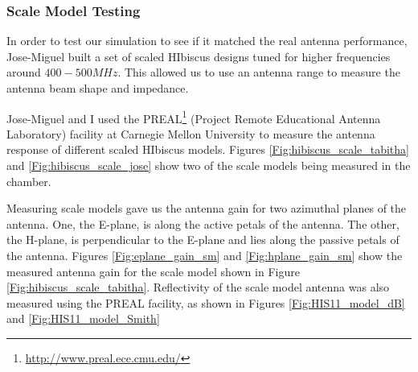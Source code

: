 \subsubsection{Scale Model Testing}

In order to test our simulation to see if it matched the real antenna performance, Jose-Miguel built a set of scaled HIbiscus designs tuned for higher frequencies around $400-500 MHz$. This allowed us to use an antenna range to measure the antenna beam shape and impedance. 

Jose-Miguel and I used the PREAL\footnote{\url{http://www.preal.ece.cmu.edu/}} (Project Remote Educational Antenna Laboratory) facility at Carnegie Mellon University to measure the antenna response of different scaled HIbiscus models. Figures \ref{Fig:hibiscus_scale_tabitha} and \ref{Fig:hibiscus_scale_jose} show two of the scale models being measured in the chamber.

Measuring scale models gave us the antenna gain for two azimuthal planes of the antenna. One, the E-plane, is along the active petals of the antenna. The other, the H-plane, is perpendicular to the E-plane and lies along the passive petals of the antenna. Figures \ref{Fig:eplane_gain_sm} and \ref{Fig:hplane_gain_sm} show the measured antenna gain for the scale model shown in Figure \ref{Fig:hibiscus_scale_tabitha}. Reflectivity of the scale model antenna was also measured using the PREAL facility, as shown in Figures \ref{Fig:HIS11_model_dB} and \ref{Fig:HIS11_model_Smith}

